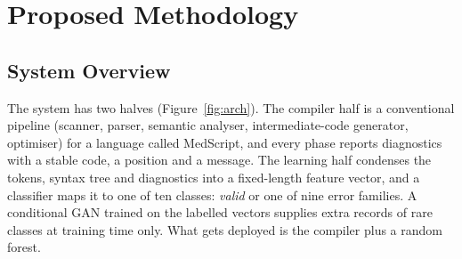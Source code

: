 \section{Proposed Methodology}

\subsection{System Overview}

The system has two halves (Figure~\ref{fig:arch}). The compiler half is a conventional pipeline (scanner, parser,
semantic analyser, intermediate-code generator, optimiser) for a language called MedScript, and every phase reports
diagnostics with a stable code, a position and a message. The learning half condenses the tokens, syntax tree and
diagnostics into a fixed-length feature vector, and a classifier maps it to one of ten classes: \emph{valid} or one of
nine error families. A conditional GAN trained on the labelled vectors supplies extra records of rare classes at
training time only. What gets deployed is the compiler plus a random forest.

